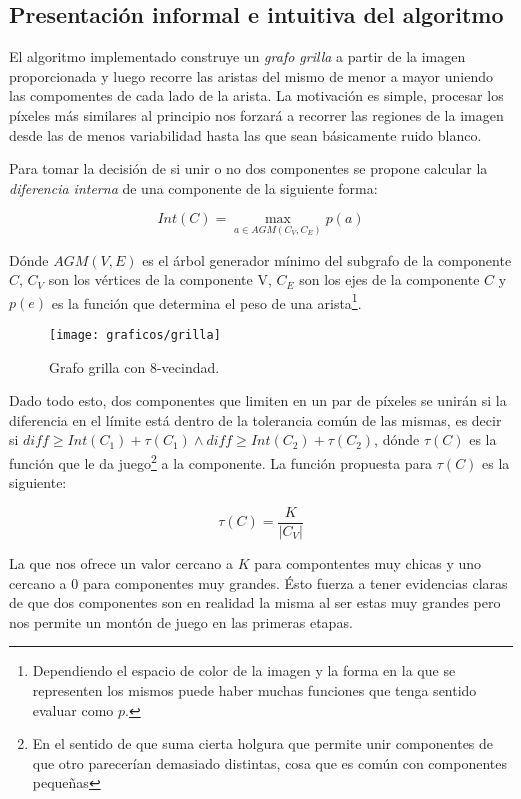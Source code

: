 \subsection{Presentación informal e intuitiva del algoritmo}

El algoritmo implementado construye un \emph{grafo grilla} a partir de la
imagen proporcionada y luego recorre las aristas del mismo de menor a mayor
uniendo las compomentes de cada lado de la arista. La motivación es simple,
procesar los píxeles más similares al principio nos forzará a recorrer las
regiones de la imagen desde las de menos variabilidad hasta las que sean
básicamente ruido blanco.

Para tomar la decisión de si unir o no dos componentes se propone calcular la
\emph{diferencia interna} de una componente de la siguiente forma:

$$Int(C) = \max_{a \in AGM(C_V, C_E)} p(a)$$

Dónde $AGM(V, E)$ es el árbol generador mínimo del subgrafo de la componente
$C$, $C_V$ son los vértices de la componente V, $C_E$ son los ejes de la
componente $C$ y $p(e)$ es la función que determina el peso de una
arista\footnote{ Dependiendo el espacio de color de la imagen y la forma en la
que se representen los mismos puede haber muchas funciones que tenga sentido
evaluar como $p$.}.

\begin{figure}[h]
	\centering
	\texttt{[image: graficos/grilla]}
	\caption{Grafo grilla con 8-vecindad.}
\end{figure}

Dado todo esto, dos componentes que limiten en un par de píxeles se unirán si
la diferencia en el límite está dentro de la tolerancia común de las mismas, es
decir si $\textit{diff} \geq Int(C_1) + \tau(C_1) \land \textit{diff} \geq
Int(C_2) + \tau(C_2)$, dónde $\tau(C)$ es la función que le da juego\footnote{
En el sentido de que suma cierta holgura que permite unir componentes de que
otro parecerían demasiado distintas, cosa que es común con componentes
pequeñas} a la componente. La función propuesta para $\tau(C)$ es la siguiente:

$$\tau(C) = \frac{K}{|C_V|}$$

La que nos ofrece un valor cercano a $K$ para compontentes muy chicas y uno
cercano a $0$ para componentes muy grandes. Ésto fuerza a tener evidencias
claras de que dos componentes son en realidad la misma al ser estas muy grandes
pero nos permite un montón de juego en las primeras etapas.

